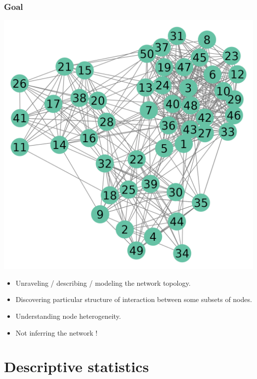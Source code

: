 \documentclass[compress,10pt]{beamer}
\begin{document}
\begin{frame}\frametitle{Goal}

 
 
\begin{center}
 \includegraphics[scale=.45]{plots/network_raw.png}
\end{center}

\begin{itemize}
 \item Unraveling / describing / modeling the network topology. 
 \item Discovering particular structure of interaction between some subsets of nodes.
 \item Understanding node heterogeneity.
 \item Not inferring the network !
 \end{itemize}


\end{frame}




\section{Descriptive statistics}
\end{document}
